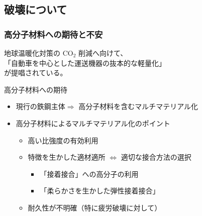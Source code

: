 \documentclass[12pt, dvipdfmx]{beamer}
\begin{document}
\subsection{破壊について}
\begin{frame}
	\frametitle{高分子材料への期待と不安}
	地球温暖化対策の CO$_2$ 削減へ向けて、\\
	{\color{red}「自動車を中心とした運送機器の抜本的な軽量化」}
	\\
	が提唱されている。
	\begin{block}{高分子材料への期待}
		\begin{itemize}
			\item 現行の鉄鋼主体$ \Rightarrow$ 高分子材料を含むマルチマテリアル化
			\item 高分子材料によるマルチマテリアル化のポイント
				\begin{itemize}
					\item 高い比強度の有効利用
					\item 特徴を生かした適材適所 $\Leftrightarrow$ 適切な接合方法の選択
						\begin{itemize}
							\item {\color{red} 「接着接合」への高分子の利用}
							\item {\color{red} 「柔らかさを生かした弾性接着接合」}
						\end{itemize}
					\item {\color{blue}耐久性が不明確（特に疲労破壊に対して）}
				\end{itemize}
		\end{itemize}
	\end{block}
\end{frame}
\end{document}
